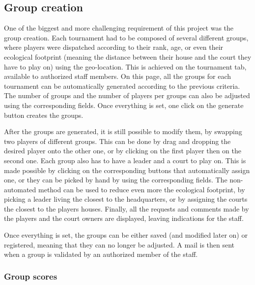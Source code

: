 \subsection{Group creation}
\label{sub:Group creation}


One of the biggest and more challenging requirement of this project was the group creation. Each tournament had to be composed of several different groups, where players were dispatched according to their rank, age, or even their ecological footprint (meaning the distance between their house and the court they have to play on) using the geo-location. This is achieved on the tournament tab, available to authorized staff members. On this page, all the groups for each tournament can be automatically generated according to the previous criteria. The number of groups and the number of players per groups can also be adjusted using the corresponding fields. Once everything is set, one click on the generate button creates the groups. \newline

After the groups are generated, it is still possible to modify them, by swapping two players of different groups. This can be done by drag and dropping the desired player onto the other one, or by clicking on the first player then on the second one. Each group also has to have a leader and a court to play on. This is made possible by clicking on the corresponding buttons that automatically assign one, or they can be picked by hand by using the corresponding fields. The non-automated method can be used to reduce even more the ecological footprint, by picking a leader living the closest to the headquarters, or by assigning the courts the closest to the players houses. Finally, all the requests and comments made by the players and the court owners are displayed, leaving indications for the staff. \newline

Once everything is set, the groups can be either saved (and modified later on) or registered, meaning that they can no longer be adjusted. A mail is then sent when a group is validated by an authorized member of the staff.

\subsubsection{Group scores}
\label{subs:Group scores}


